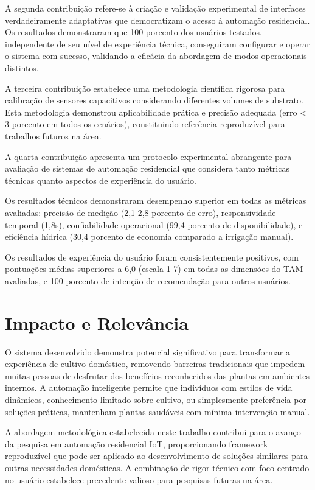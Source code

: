 \documentclass[twoside,english,brazilian]{UNISINOSmonografia}
\begin{document}
A segunda contribuição refere-se à criação e validação experimental de interfaces verdadeiramente adaptativas que democratizam o acesso à automação residencial. Os resultados demonstraram que 100 porcento dos usuários testados, independente de seu nível de experiência técnica, conseguiram configurar e operar o sistema com sucesso, validando a eficácia da abordagem de modos operacionais distintos.

A terceira contribuição estabelece uma metodologia científica rigorosa para calibração de sensores capacitivos considerando diferentes volumes de substrato. Esta metodologia demonstrou aplicabilidade prática e precisão adequada (erro < 3 porcento em todos os cenários), constituindo referência reproduzível para trabalhos futuros na área.

A quarta contribuição apresenta um protocolo experimental abrangente para avaliação de sistemas de automação residencial que considera tanto métricas técnicas quanto aspectos de experiência do usuário.

Os resultados técnicos demonstraram desempenho superior em todas as métricas avaliadas: precisão de medição (2,1-2,8 porcento de erro), responsividade temporal (1,8s), confiabilidade operacional (99,4 porcento de disponibilidade), e eficiência hídrica (30,4 porcento de economia comparado a irrigação manual).

Os resultados de experiência do usuário foram consistentemente positivos, com pontuações médias superiores a 6,0 (escala 1-7) em todas as dimensões do TAM avaliadas, e 100 porcento de intenção de recomendação para outros usuários.

\section{Impacto e Relevância}

O sistema desenvolvido demonstra potencial significativo para transformar a experiência de cultivo doméstico, removendo barreiras tradicionais que impedem muitas pessoas de desfrutar dos benefícios reconhecidos das plantas em ambientes internos. A automação inteligente permite que indivíduos com estilos de vida dinâmicos, conhecimento limitado sobre cultivo, ou simplesmente preferência por soluções práticas, mantenham plantas saudáveis com mínima intervenção manual.

A abordagem metodológica estabelecida neste trabalho contribui para o avanço da pesquisa em automação residencial IoT, proporcionando framework reproduzível que pode ser aplicado ao desenvolvimento de soluções similares para outras necessidades domésticas. A combinação de rigor técnico com foco centrado no usuário estabelece precedente valioso para pesquisas futuras na área.
\end{document}
